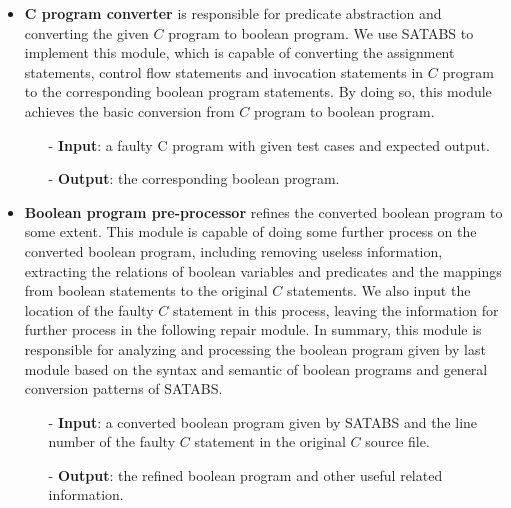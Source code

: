 \begin{itemize}
\item \textbf{C program converter} is responsible for predicate abstraction and converting the given $C$ program to boolean program.
We use SATABS\cite{SATABS} to implement this module, which is capable of converting the assignment statements, control flow statements and invocation statements in $C$ program to the corresponding boolean program statements.
By doing so, this module achieves the basic conversion from $C$ program to boolean program.

\begin{itemize}
\item[-] \textbf{Input}: a faulty C program with given test cases and expected output.
\item[-] \textbf{Output}: the corresponding boolean program.
\end{itemize}

\item \textbf{Boolean program pre-processor} refines the converted boolean program to some extent. This module is capable of doing some further process on the converted boolean program,
including removing useless information, extracting the relations of boolean variables and predicates and the mappings from boolean statements to the original $C$ statements.
We also input the location of the faulty $C$ statement in this process, leaving the information for further process in the following repair module.
In summary, this module is responsible for analyzing and processing the boolean program given by last module based on the syntax and semantic of boolean programs and general conversion patterns of SATABS.

\begin{itemize}
\item[-] \textbf{Input}: a converted boolean program given by SATABS and the line number of the faulty $C$ statement in the original $C$ source file.
\item[-] \textbf{Output}: the refined boolean program and other useful related information.
\end{itemize}


\end{itemize}
